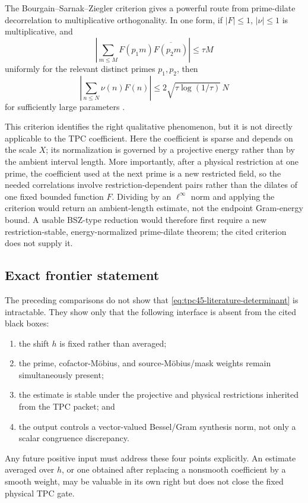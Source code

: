 The Bourgain--Sarnak--Ziegler criterion gives a powerful route from
prime-dilate decorrelation to multiplicative orthogonality.  In one
form, if \(|F|\le1\), \(|\nu|\le1\) is multiplicative, and
\[
 \left|\sum_{m\le M}F(p_1m)\overline{F(p_2m)}\right|
 \le \tau M
\]
uniformly for the relevant distinct primes \(p_1,p_2\), then
\[
 \left|\sum_{n\le N}\nu(n)F(n)\right|
 \le 2\sqrt{\tau\log(1/\tau)}\,N
\]
for sufficiently large parameters \cite[Theorem~2]{BSZ2013}.

This criterion identifies the right qualitative phenomenon, but it is
not directly applicable to the TPC coefficient.  Here the coefficient
is sparse and depends on the scale \(X\); its normalization is governed
by a projective energy rather than by the ambient interval length.
More importantly, after a physical restriction at one prime, the
coefficient used at the next prime is a new restricted field, so the
needed correlations involve restriction-dependent pairs rather than
the dilates of one fixed bounded function \(F\).  Dividing by an
\(\ell^\infty\) norm and applying the criterion would return an
ambient-length estimate, not the endpoint Gram-energy bound.  A usable
BSZ-type reduction would therefore first require a new
restriction-stable, energy-normalized prime-dilate theorem; the cited
criterion does not supply it.

\subsection{Exact frontier statement}

The preceding comparisons do not show that
\eqref{eq:tpc45-literature-determinant} is intractable.  They show only
that the following interface is absent from the cited black boxes:
\begin{enumerate}[label=\textup{(\roman*)},leftmargin=2.4em]
 \item the shift \(h\) is fixed rather than averaged;
 \item the prime, cofactor-M\"obius, and source-M\"obius/mask weights
       remain simultaneously present;
 \item the estimate is stable under the projective and physical
       restrictions inherited from the TPC packet; and
 \item the output controls a vector-valued Bessel/Gram synthesis norm,
       not only a scalar congruence discrepancy.
\end{enumerate}
Any future positive input must address these four points explicitly.
An estimate averaged over \(h\), or one obtained after replacing a
nonsmooth coefficient by a smooth weight, may be valuable in its own
right but does not close the fixed physical TPC gate.
